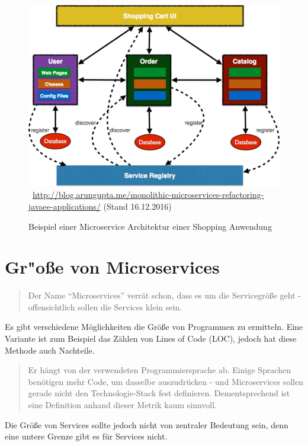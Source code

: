 \begin{figure}[htb]
	\centering 
	\includegraphics[width=\linewidth]{content/images/javaee-microservices}\
	\quelle\url{http://blog.arungupta.me/monolithic-microservices-refactoring-javaee-applications/} (Stand 16.12.2016)
	\caption{Beispiel einer Microservice Architektur einer Shopping Anwendung}
	\label{fig:MicroserviceArchitektur} 
\end{figure}

\section{Gr"o\ss e von Microservices}
\label{sec:groesseMicroservice}
\begin{quotation}
    \frqq Der Name "`Microservices"' verrät schon, dass es um die Servicegröße geht - offensichtlich sollen die Services klein sein.\flqq\ \cite[S. 31]{EWolff2016:Microservices}
\end{quotation}
Es gibt verschiedene Möglichkeiten die Größe von Programmen zu ermitteln. Eine Variante ist zum Beispiel das Zählen von  Lines of Code (LOC), jedoch hat diese Methode auch Nachteile.

\begin{quotation}
	\frqq Er hängt von der verwendeten Programmiersprache ab. Einige Sprachen benötigen mehr Code, um dasselbe auszudrücken - und Microservices sollen gerade nicht den Technologie-Stack fest definieren. Dementsprechend ist eine Definition anhand dieser Metrik kaum sinnvoll.\flqq\ \cite[S. 31]{EWolff2016:Microservices}
\end{quotation}

Die Größe von Services sollte jedoch nicht von zentraler Bedeutung sein, denn eine untere Grenze gibt es für Services nicht.

